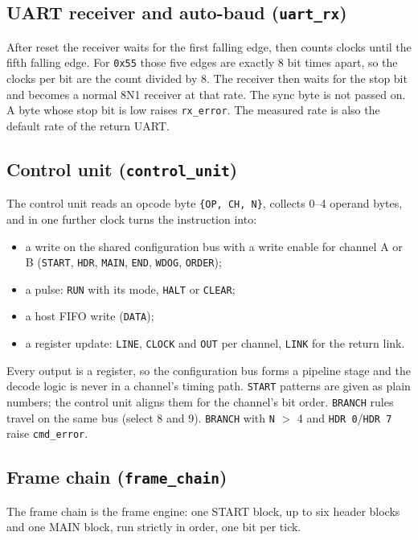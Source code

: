 \documentclass[11pt,a4paper]{article}
\newcommand{\sig}[1]{\texttt{#1}}
\begin{document}
\subsection{UART receiver and auto-baud (\sig{uart\_rx})}

After reset the receiver waits for the first falling edge, then counts clocks until the fifth falling edge. For \texttt{0x55} those five edges are exactly 8 bit times apart, so the clocks per bit are the count divided by 8. The receiver then waits for the stop bit and becomes a normal 8N1 receiver at that rate. The sync byte is not passed on. A byte whose stop bit is low raises \sig{rx\_error}. The measured rate is also the default rate of the return UART.

\subsection{Control unit (\sig{control\_unit})}

The control unit reads an opcode byte \texttt{\{OP, CH, N\}}, collects 0--4 operand bytes, and in one further clock turns the instruction into:
\begin{itemize}
\item a write on the shared configuration bus with a write enable for channel A or B (\sig{START}, \sig{HDR}, \sig{MAIN}, \sig{END}, \sig{WDOG}, \sig{ORDER});
\item a pulse: \sig{RUN} with its mode, \sig{HALT} or \sig{CLEAR};
\item a host FIFO write (\sig{DATA});
\item a register update: \sig{LINE}, \sig{CLOCK} and \sig{OUT} per channel, \sig{LINK} for the return link.
\end{itemize}
Every output is a register, so the configuration bus forms a pipeline stage and the decode logic is never in a channel's timing path. \sig{START} patterns are given as plain numbers; the control unit aligns them for the channel's bit order. \sig{BRANCH} rules travel on the same bus (select 8 and 9). \sig{BRANCH} with \sig{N} $>$ 4 and \sig{HDR 0}/\sig{HDR 7} raise \sig{cmd\_error}.

\subsection{Frame chain (\sig{frame\_chain})}

The frame chain is the frame engine: one START block, up to six header blocks and one MAIN block, run strictly in order, one bit per tick.
\end{document}
